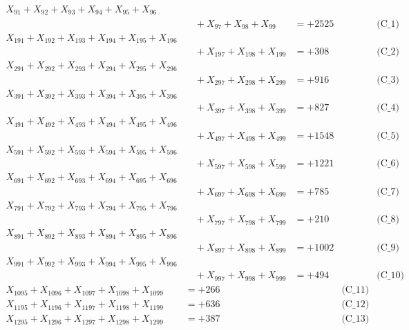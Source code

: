\documentclass[a4paper,10pt]{article}
\begin{document}
\allowdisplaybreaks
{\small
\begin{align}
X_{91} + X_{92} + X_{93} + X_{94} + X_{95} + X_{96} \\[0.1ex]
&\quad  + X_{97} + X_{98} + X_{99} &= +2525 && \text{(C\_1)} \\
X_{191} + X_{192} + X_{193} + X_{194} + X_{195} + X_{196} \\[0.1ex]
&\quad  + X_{197} + X_{198} + X_{199} &= +308 && \text{(C\_2)} \\
X_{291} + X_{292} + X_{293} + X_{294} + X_{295} + X_{296} \\[0.1ex]
&\quad  + X_{297} + X_{298} + X_{299} &= +916 && \text{(C\_3)} \\
X_{391} + X_{392} + X_{393} + X_{394} + X_{395} + X_{396} \\[0.1ex]
&\quad  + X_{397} + X_{398} + X_{399} &= +827 && \text{(C\_4)} \\
X_{491} + X_{492} + X_{493} + X_{494} + X_{495} + X_{496} \\[0.1ex]
&\quad  + X_{497} + X_{498} + X_{499} &= +1548 && \text{(C\_5)} \\
\allowbreak
X_{591} + X_{592} + X_{593} + X_{594} + X_{595} + X_{596} \\[0.1ex]
&\quad  + X_{597} + X_{598} + X_{599} &= +1221 && \text{(C\_6)} \\
X_{691} + X_{692} + X_{693} + X_{694} + X_{695} + X_{696} \\[0.1ex]
&\quad  + X_{697} + X_{698} + X_{699} &= +785 && \text{(C\_7)} \\
X_{791} + X_{792} + X_{793} + X_{794} + X_{795} + X_{796} \\[0.1ex]
&\quad  + X_{797} + X_{798} + X_{799} &= +210 && \text{(C\_8)} \\
X_{891} + X_{892} + X_{893} + X_{894} + X_{895} + X_{896} \\[0.1ex]
&\quad  + X_{897} + X_{898} + X_{899} &= +1002 && \text{(C\_9)} \\
X_{991} + X_{992} + X_{993} + X_{994} + X_{995} + X_{996} \\[0.1ex]
&\quad  + X_{997} + X_{998} + X_{999} &= +494 && \text{(C\_10)} \\
\allowbreak
X_{1095} + X_{1096} + X_{1097} + X_{1098} + X_{1099} &= +266 && \text{(C\_11)} \\
X_{1195} + X_{1196} + X_{1197} + X_{1198} + X_{1199} &= +636 && \text{(C\_12)} \\
X_{1295} + X_{1296} + X_{1297} + X_{1298} + X_{1299} &= +387 && \text{(C\_13)} \\

\end{align}}
\end{document}

